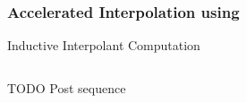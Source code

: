 \begin{frame}[t]
	\frametitle{Accelerated Interpolation using \qvasr}
	\begin{center}
		Inductive Interpolant Computation
	\end{center}
	\begin{columns}
		\begin{column}{0.45\textwidth}
			\resizebox{0.75\textwidth}{!}{}
			TODO Post sequence
		\end{column}
		\begin{column}{0.45\textwidth}
			\begin{center}
				\resizebox{0.75\textwidth}{!}{}
			\end{center}
		\end{column}
	\end{columns}
\end{frame}